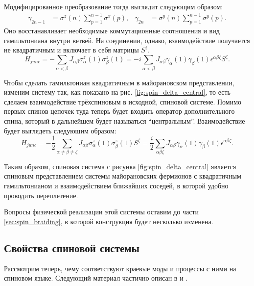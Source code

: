 \documentclass[a4paper,12pt]{article}
\theoremstyle{plain} %
\theoremstyle{definition} %
\theoremstyle{remark} %
\begin{document}
Модифицированное преобразование тогда выглядит следующим образом:
\begin{align}
    \gamma_{2n-1} &= \sigma^z (n) \sum\limits_{p=1}^{n-1} \sigma^x (p), & 
    \gamma_{2n} &= \sigma^y (n) \sum\limits_{p=1}^{n-1} \sigma^y (p).
\end{align}
Оно восстанавливает необходимые коммутационные соотношения и вид гамильтониана внутри ветвей. На соединении, однако, взаимодействие получается не квадратичным и включает в себя матрицы $S^i$.
\begin{equation}
    H_{junc} = - \sum\limits_{\alpha < \beta} J_{\alpha \beta} \sigma_\alpha^z (1) \sigma_\beta^z (1) = - i \sum\limits_{\alpha < \beta} J_{\alpha \beta} \gamma_\alpha (1) \gamma_\beta (1) \epsilon^{\alpha \beta \zeta} S^\zeta.
\end{equation}

Чтобы сделать гамильтониан квадратичным в майорановском представлении, изменим систему так, как показано на рис. \ref{fig:spin_delta_central}, то есть сделаем взаимодействие трёхспиновым в исходной, спиновой системе. Помимо первых спинов цепочек туда теперь будет входить оператор дополнительного спина, который в дальнейшем будет называться ``центральным''. Взаимодействие будет выглядеть следующим образом:
\begin{equation}
    H_{junc} = - \frac{1}{2} \sum\limits_{\alpha \neq \beta \neq \zeta} J_{\alpha \beta} \sigma_\alpha^z (1) \sigma_\beta^z (1) S^\zeta = \frac{i}{2} \sum\limits_{\alpha \beta \zeta} J_{\alpha \beta} \gamma_\alpha (1) \gamma_\beta (1) \epsilon^{\alpha \beta \zeta}.
    \label{eq:junc_H}
\end{equation}

Таким образом, спиновая система с рисунка \ref{fig:spin_delta_central} является спиновым представлением системы майорановских фермионов с квадратичным гамильтонианом и взаимодействием ближайших соседей, в которой удобно проводить переплетение.

Вопросы физической реализации этой системы оставим до части \ref{sec:spin_braiding}, в которой конструкция будет несколько изменена. 

\pagebreak

\subsection{Свойства спиновой системы}

Рассмотрим теперь, чему соответствуют краевые моды и процессы с ними на спиновом языке. Следующий материал частично описан в \cite{arrays} и \cite{main}.
\end{document}
